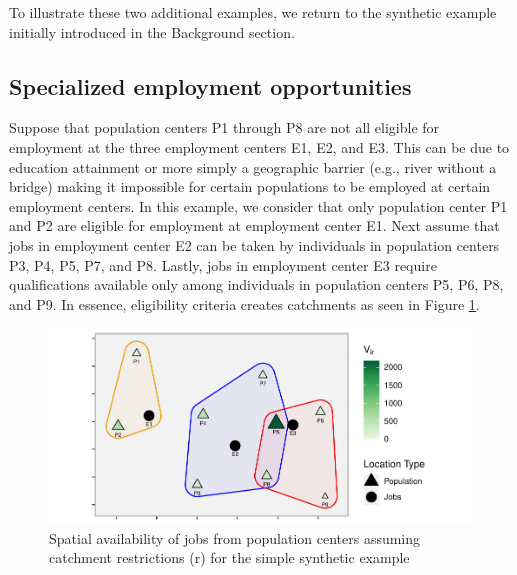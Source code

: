 \documentclass[]{elsarticle} %
\begin{document}
To illustrate these two additional examples, we return to the synthetic
example initially introduced in the Background section.

\hypertarget{specialized-employment-opportunities}{%
\subsection{Specialized employment
opportunities}\label{specialized-employment-opportunities}}

Suppose that population centers P1 through P8 are not all eligible for
employment at the three employment centers E1, E2, and E3. This can be
due to education attainment or more simply a geographic barrier (e.g.,
river without a bridge) making it impossible for certain populations to
be employed at certain employment centers. In this example, we consider
that only population center P1 and P2 are eligible for employment at
employment center E1. Next assume that jobs in employment center E2 can
be taken by individuals in population centers P3, P4, P5, P7, and P8.
Lastly, jobs in employment center E3 require qualifications available
only among individuals in population centers P5, P6, P8, and P9. In
essence, eligibility criteria creates catchments as seen in Figure
\ref{fig:toy-example-availability-with-catchments}.

\begin{figure}
\includegraphics[width=1\linewidth]{Spatial-Availability_files/figure-latex/toy-example-availability-with-catchments-1} \caption{\label{fig:toy-example-availability-with-catchments}Spatial availability of jobs from population centers assuming catchment restrictions (r) for the simple synthetic example}\label{fig:toy-example-availability-with-catchments}
\end{figure}
\end{document}
